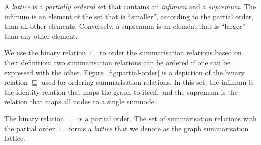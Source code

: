 A \emph{lattice} is a \emph{partially ordered} set that contains an \emph{infimum} and a \emph{supremum}. The infimum is an element of the set that is ``smaller'', according to the partial order, than all other elements. Conversely, a supremum is an element that is ``larger'' than any other element.

We use the binary relation $\sqsubseteq$ to order the summarisation relations based on their definition: two summarisation relations can be ordered if one can be expressed with the other. Figure~\ref{fig:partial-order} is a depiction of the binary relation $\sqsubseteq$ used for ordering summarisation relations. In this set, the infimum is the identity relation that maps the graph to itself, and the supremum is the relation that maps all nodes to a single sumnode.

\begin{theorem}
The binary relation $\sqsubseteq$ is a partial order. The set of summarisation relations with the partial order $\sqsubseteq$ forms a \emph{lattice} that we denote as the graph summarisation lattice.
\end{theorem}

